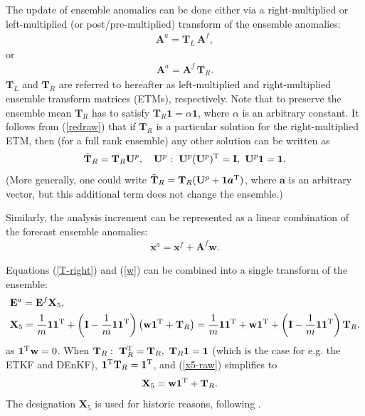 \documentclass[11pt]{report}
\newcommand{\mb} {\mathbf}
\newcommand{\ms} {\boldsymbol}
\newcommand{\T}{^{\tiny \mathrm T}}
\begin{document}
The update of ensemble anomalies can be done either via a right-multiplied or left-multiplied (or post/pre-multiplied) transform of the ensemble anomalies:
\begin{align}
  \label{T-left}
  \mb A^a = \mb T_L \,\mb A^f,
\end{align}
or
\begin{align}
  \label{T-right}
  \mb A^a = \mb A^f \, \mb T_R.
\end{align}
$\mb T_L$ and $\mb T_R$ are referred to hereafter as left-multiplied and right-multiplied ensemble transform matrices (ETMs), respectively.
Note that to preserve the ensemble mean $\mb T_R$ has to satisfy $\mb T_R \mb 1 = \alpha \mb 1$, where $\alpha$ is an arbitrary constant.
It follows from (\ref{redraw}) that if $\mb T_R$ is a particular solution for the right-multiplied ETM, then (for a full rank ensemble) any other solution can be written as
\begin{align}
  \label{TR-all}
  \tilde{\mb T}_R = \mb T_R \mb U^p, \quad \mb U^p:\ \mb U^p (\mb U^p)\T = \mb I,\ \mb U^p \mb 1 = \mb 1.
\end{align}
(More generally, one could write $\tilde{\mb T}_R = \mb T_R (\mb U^p + \mb 1 \ms a\T)$, where $\ms a$ is an arbitrary vector, but this additional term does not change the ensemble.)

Similarly, the analysis increment can be represented as a linear combination of the forecast ensemble anomalies:
\begin{align}
  \label{w}
  \mb x^a = \mb x^f + \mb A^f \mb w.
\end{align}

Equations (\ref{T-right}) and (\ref{w}) can be combined into a single transform of the ensemble:
\begin{align}
  \label{x5-def}
  & \mb E^a = \mb E^f \mb X_5,\\
  \label{x5-raw}
  & \mb X_5 = \frac{1}{m} \mb 1 \mb 1\T + \left( \mb I - \frac{1}{m} \mb 1 \mb 1\T\right) \left( \mb w \mb 1\T + \mb T_R\right)
  = \frac{1}{m} \mb 1 \mb 1\T + \mb w \mb 1\T + \left( \mb I - \frac{1}{m} \mb 1 \mb 1\T \right) \mb T_R,
\end{align}
as $\mb 1\T \mb w = 0$. 
When $\mb T_R:\ \mb T_R\T = \mb T_R,\ \mb T_R \mb 1 = \mb 1$ (which is the case for e.g. the ETKF and DEnKF), $\mb 1\T \mb T_R = \mb 1\T$, and (\ref{x5-raw}) simplifies to
\begin{align}
  \label{x5}
  & \mb X_5 = \mb w \mb 1\T + \mb T_R.
\end{align}
The designation $\mb X_5$ is used for historic reasons, following \citet{eve03a}.
\end{document}
